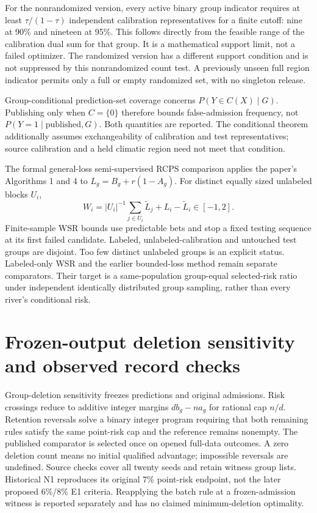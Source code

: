 \documentclass[draft]{agujournal2025}
\begin{document}
For the nonrandomized version, every active binary group indicator requires at least $\tau/(1-\tau)$ independent calibration representatives for a finite cutoff: nine at 90\% and nineteen at 95\%. This follows directly from the feasible range of the calibration dual sum for that group. It is a mathematical support limit, not a failed optimizer. The randomized version has a different support condition and is not suppressed by this nonrandomized count test. A previously unseen full region indicator permits only a full or empty randomized set, with no singleton release.

Group-conditional prediction-set coverage concerns $P(Y\in C(X)\mid G)$. Publishing only when $C=\{0\}$ therefore bounds false-admission frequency, not $P(Y=1\mid\text{published},G)$. Both quantities are reported. The conditional theorem additionally assumes exchangeability of calibration and test representatives; source calibration and a held climatic region need not meet that condition.

The formal general-loss semi-supervised RCPS comparison applies the paper's Algorithms 1 and 4 to $L_g=B_g+r(1-A_g)$. For distinct equally sized unlabeled blocks $U_i$,
\[
 W_i=|U_i|^{-1}\sum_{j\in U_i}\widetilde L_j+L_i-\widetilde L_i\in[-1,2].
\]
Finite-sample WSR bounds use predictable bets and stop a fixed testing sequence at its first failed candidate. Labeled, unlabeled-calibration and untouched test groups are disjoint. Too few distinct unlabeled groups is an explicit status. Labeled-only WSR and the earlier bounded-loss method remain separate comparators. Their target is a same-population group-equal selected-risk ratio under independent identically distributed group sampling, rather than every river's conditional risk.

\section{Frozen-output deletion sensitivity and observed record checks}
Group-deletion sensitivity freezes predictions and original admissions. Risk crossings reduce to additive integer margins $d b_g-n a_g$ for rational cap $n/d$. Retention reversals solve a binary integer program requiring that both remaining rules satisfy the same point-risk cap and the reference remains nonempty. The published comparator is selected once on opened full-data outcomes. A zero deletion count means no initial qualified advantage; impossible reversals are undefined. Source checks cover all twenty seeds and retain witness group lists. Historical N1 reproduces its original 7\% point-risk endpoint, not the later proposed 6\%/8\% E1 criteria. Reapplying the batch rule at a frozen-admission witness is reported separately and has no claimed minimum-deletion optimality.
\end{document}

